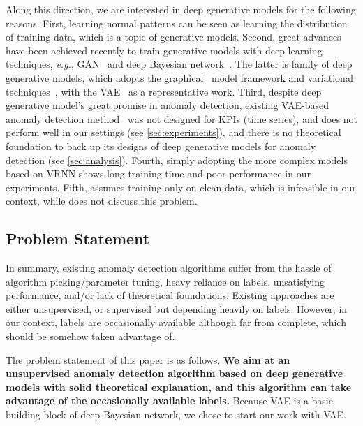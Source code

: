 \documentclass[sigconf]{acmart}
\newcommand\compactvspace[1]{\vspace{#1}}
\newcommand\compactvspace[1]{}
\newcommand{\IE}{\textit{i.e.}}
\newcommand{\EG}{\textit{e.g.}}
\newcommand{\vv}[1]{\bm{\mathrm{{#1}}}}
\begin{document}
Along this direction, we are interested in deep generative models for the following reasons. First,  learning normal patterns can be seen as learning the distribution of training data,
which is a topic of generative models. Second, great advances have been achieved recently to train generative models with deep learning techniques, \EG, GAN~\cite{gan} and deep Bayesian network~\cite{prml,deep-bayes}.
The latter is family of deep generative models, which adopts the graphical~\cite{graph} model framework and variational techniques~\cite{variational}, with the VAE~\cite{kingma_auto-encoding_2014,rezende_stochastic_2014} as a representative work.
Third, despite deep generative model's great promise in anomaly detection, existing VAE-based anomaly detection method~\cite{vae-ad} was not designed for KPIs (time series), and does not perform well in our settings (see \cref{sec:experiments}), and there is no theoretical foundation to back up its designs of  deep generative models for anomaly detection (see \cref{sec:analysis}).
Fourth, simply adopting the more complex models~\cite{vi-storn} based on VRNN shows long training time and poor performance in our experiments.
Fifth,  \cite{vae-ad} assumes training only on clean data, which is infeasible in our context,  while \cite{vi-storn} does not discuss this problem.

\compactvspace{-.5em}
\subsection{Problem Statement}
\label{sec:problem}
In summary, existing anomaly detection algorithms suffer from the hassle of algorithm picking/parameter tuning, heavy reliance on labels, unsatisfying performance, and/or lack of theoretical foundations. Existing approaches are either unsupervised, or supervised but depending heavily on labels. However, in our context, labels are occasionally available although far from complete, which should be somehow taken advantage of.

The problem statement of this paper is as follows. \textbf{We aim at an unsupervised anomaly detection algorithm based on deep generative models with solid theoretical explanation, and this algorithm can take advantage of the occasionally available labels.} Because VAE is a basic building block of deep Bayesian network, we chose to start our work with VAE.

\end{document}
